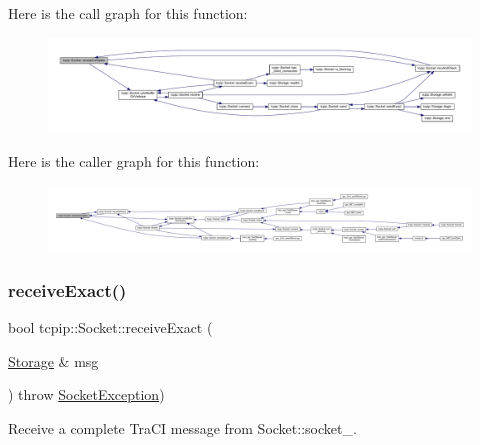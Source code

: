 Here is the call graph for this function\+:\nopagebreak
\begin{figure}[H]
\begin{center}
\leavevmode
\includegraphics[width=350pt]{classtcpip_1_1_socket_ac752adee7260dc7e7778f639febc0cf1_cgraph}
\end{center}
\end{figure}
Here is the caller graph for this function\+:\nopagebreak
\begin{figure}[H]
\begin{center}
\leavevmode
\includegraphics[width=350pt]{classtcpip_1_1_socket_ac752adee7260dc7e7778f639febc0cf1_icgraph}
\end{center}
\end{figure}
\mbox{\label{classtcpip_1_1_socket_a0d00337ac1fbad2cf183f0a651539e2e}} 
\subsubsection{\texorpdfstring{receive\+Exact()}{receiveExact()}}
{\footnotesize\ttfamily bool tcpip\+::\+Socket\+::receive\+Exact (\begin{DoxyParamCaption}\item[{\hyperlink{classtcpip_1_1_storage}{Storage} \&}]{msg }\end{DoxyParamCaption}) throw  \hyperlink{classtcpip_1_1_socket_exception}{Socket\+Exception}) }



Receive a complete Tra\+CI message from Socket\+::socket\+\_\+. 

